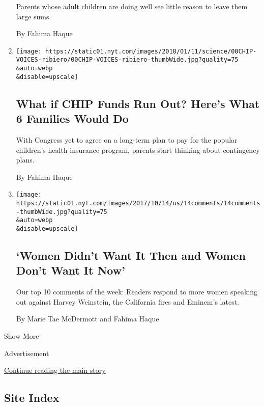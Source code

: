 \begin{enumerate}
  Parents whose adult children are doing well see little reason to leave
  them large sums.

  By Fahima Haque
\item
  \href{/2018/01/10/health/chip-insurance-children-funding.html}{}

  \texttt{[image: https://static01.nyt.com/images/2018/01/11/science/00CHIP-VOICES-ribiero/00CHIP-VOICES-ribiero-thumbWide.jpg?quality=75\\\&auto=webp\\\&disable=upscale]}

  \hypertarget{what-if-chip-funds-run-out-heres-what-6-families-would-do}{%
  \subsection{What if CHIP Funds Run Out? Here's What 6 Families Would
  Do}\label{what-if-chip-funds-run-out-heres-what-6-families-would-do}}

  With Congress yet to agree on a long-term plan to pay for the popular
  children's health insurance program, parents start thinking about
  contingency plans.

  By Fahima Haque
\item
  \href{/2017/10/14/insider/women-didnt-want-it-then-and-women-dont-want-it-now.html}{}

  \texttt{[image: https://static01.nyt.com/images/2017/10/14/us/14comments/14comments-thumbWide.jpg?quality=75\\\&auto=webp\\\&disable=upscale]}

  \hypertarget{women-didnt-want-it-then-and-women-dont-want-it-now}{%
  \subsection{`Women Didn't Want It Then and Women Don't Want It
  Now'}\label{women-didnt-want-it-then-and-women-dont-want-it-now}}

  Our top 10 comments of the week: Readers respond to more women
  speaking out against Harvey Weinstein, the California fires and
  Eminem's latest.

  By Marie Tae McDermott and Fahima Haque
\end{enumerate}

Show More

Advertisement

\protect\hyperlink{after-mid2}{Continue reading the main story}

\hypertarget{site-index}{%
\subsection{Site Index}\label{site-index}}

